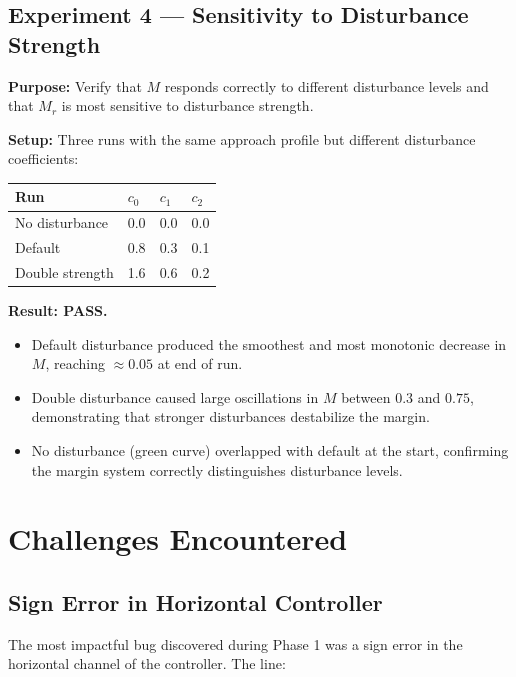 \documentclass[12pt]{article}
\begin{document}
\subsection{Experiment 4 --- Sensitivity to Disturbance Strength}

\textbf{Purpose:} Verify that $M$ responds correctly to different
disturbance levels and that $M_r$ is most sensitive to disturbance strength.

\textbf{Setup:} Three runs with the same approach profile but different
disturbance coefficients:

\begin{center}
\begin{tabular}{llll}
\toprule
\textbf{Run} & $c_0$ & $c_1$ & $c_2$ \\
\midrule
No disturbance    & 0.0 & 0.0 & 0.0 \\
Default           & 0.8 & 0.3 & 0.1 \\
Double strength   & 1.6 & 0.6 & 0.2 \\
\bottomrule
\end{tabular}
\end{center}

\textbf{Result: PASS.}
\begin{itemize}
    \item Default disturbance produced the smoothest and most monotonic
          decrease in $M$, reaching $\approx 0.05$ at end of run.
    \item Double disturbance caused large oscillations in $M$ between
          $0.3$ and $0.75$, demonstrating that stronger disturbances
          destabilize the margin.
    \item No disturbance (green curve) overlapped with default at the
          start, confirming the margin system correctly distinguishes
          disturbance levels.
\end{itemize}

\section{Challenges Encountered}

\subsection{Sign Error in Horizontal Controller}

The most impactful bug discovered during Phase 1 was a sign error in the
horizontal channel of the controller. The line:
\end{document}
